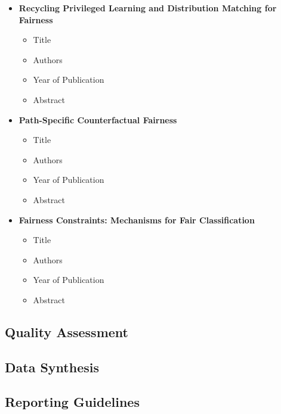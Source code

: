 \documentclass{article}
\begin{document}
\begin{itemize}
        \item \textbf{Recycling Privileged Learning and Distribution Matching for Fairness}
        \begin{itemize}
            \item Title
            \item Authors
            \item Year of Publication
            \item Abstract
        \end{itemize}
        
        \item \textbf{Path-Specific Counterfactual Fairness}
        \begin{itemize}
            \item Title
            \item Authors
            \item Year of Publication
            \item Abstract
        \end{itemize}
        
        \item \textbf{Fairness Constraints: Mechanisms for Fair Classification}
        \begin{itemize}
            \item Title
            \item Authors
            \item Year of Publication
            \item Abstract
        \end{itemize}
    \end{itemize}

    \subsection{Quality Assessment}

    \subsection{Data Synthesis}

    \subsection{Reporting Guidelines}
\end{document}
